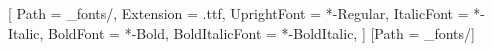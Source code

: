 \usepackage{unicode-math}
\setmainfont{STIXTwoText}[
  Path = _fonts/,
  Extension = .ttf,
  UprightFont = *-Regular,
  ItalicFont = *-Italic,
  BoldFont = *-Bold,
  BoldItalicFont = *-BoldItalic,
]
[Path = _fonts/]
